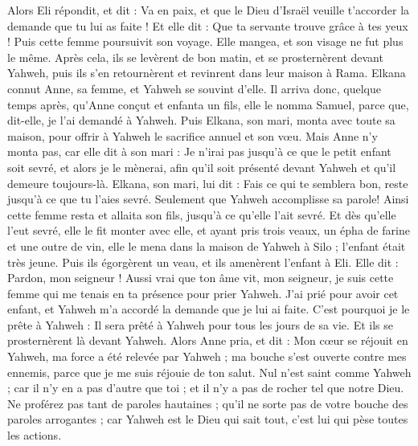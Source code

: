 \begin{multicols}{2}
Alors Eli répondit, et dit : Va en paix, et que le Dieu d'Israël veuille t'accorder la demande que tu lui as faite !
Et elle dit : Que ta servante trouve grâce à tes yeux ! Puis cette femme poursuivit son voyage. Elle mangea, et son visage ne fut plus le même.
Après cela, ils se levèrent de bon matin, et se prosternèrent devant Yahweh, puis ils s'en retournèrent et revinrent dans leur maison à Rama. Elkana connut Anne, sa femme, et Yahweh se souvint d'elle.
Il arriva donc, quelque temps après, qu'Anne conçut et enfanta un fils, elle le nomma Samuel, parce que, dit-elle, je l'ai demandé à Yahweh.
Puis Elkana, son mari, monta avec toute sa maison, pour offrir à Yahweh le sacrifice annuel et son vœu.
Mais Anne n'y monta pas, car elle dit à son mari : Je n'irai pas jusqu'à ce que le petit enfant soit sevré, et alors je le mènerai, afin qu'il soit présenté devant Yahweh et qu'il demeure toujours-là.
Elkana, son mari, lui dit : Fais ce qui te semblera bon, reste jusqu'à ce que tu l'aies sevré. Seulement que Yahweh accomplisse sa parole! Ainsi cette femme resta et allaita son fils, jusqu'à ce qu'elle l'ait sevré.
Et dès qu'elle l'eut sevré, elle le fit monter avec elle, et ayant pris trois veaux, un épha de farine et une outre de vin, elle le mena dans la maison de Yahweh à Silo ; l'enfant était très jeune.
Puis ils égorgèrent un veau, et ils amenèrent l'enfant à Eli.
Elle dit : Pardon, mon seigneur ! Aussi vrai que ton âme vit, mon seigneur, je suis cette femme qui me tenais en ta présence pour prier Yahweh.
J'ai prié pour avoir cet enfant, et Yahweh m'a accordé la demande que je lui ai faite.
C'est pourquoi je le prête à Yahweh : Il sera prêté à Yahweh pour tous les jours de sa vie. Et ils se prosternèrent là devant Yahweh.
\VerseOne{}Alors Anne pria, et dit : Mon cœur se réjouit en Yahweh, ma force a été relevée par Yahweh ; ma bouche s'est ouverte contre mes ennemis, parce que je me suis réjouie de ton salut.
Nul n'est saint comme Yahweh ; car il n'y en a pas d'autre que toi ; et il n'y a pas de rocher tel que notre Dieu.
Ne proférez pas tant de paroles hautaines ; qu'il ne sorte pas de votre bouche des paroles arrogantes ; car Yahweh est le Dieu qui sait tout, c'est lui qui pèse toutes les actions.

\end{multicols}
